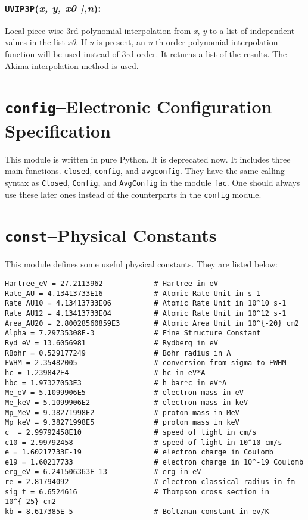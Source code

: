 \documentclass[twoside,letterpaper]{refrep}
\newcommand{\opt}[1]{
  {\textnormal{[}}{#1}\hspace{0.5mm}{\textnormal{]}}}
\newcommand{\var}[1]{\textit{#1}}
\newcommand{\key}[1]{\texttt{#1}}
\newcommand{\mod}[1]{\texttt{#1}}
\newenvironment{fundesc}[2]{
	\begin{center}
	\begin{minipage}{\textwidth}
	\subsubsection*{\key{\textbf{#1}}(\var{#2}):}
	\index{#1}
	\addcontentsline{toc}{subsubsection}{#1}}
	{\end{minipage}\end{center}}
\begin{document}
\begin{fundesc}{UVIP3P}{x, y, x0\opt{,n}}
Local piece-wise 3rd polynomial interpolation from \var{x}, \var{y} to a list
of independent values in the list \var{x0}. If \var{n} is present, an
\var{n}-th order polynomial interpolation function will be used instead of 3rd
order. It returns a list of the results. The Akima interpolation method is
used.
\end{fundesc}

\section{\mod{config}--Electronic Configuration Specification}
\label{sec:config}
This module is written in pure Python. It is deprecated now. It includes three
main functions. \key{closed}, \key{config}, and \key{avgconfig}. They have the
same calling syntax as \key{Closed}, \key{Config}, and
\key{AvgConfig} in the module \mod{fac}. One should always use these later
ones instead of the counterparts in the \mod{config} module.

\section{\mod{const}--Physical Constants}
\label{sec:const}
This module defines some useful physical constants. They are listed below:
\begin{verbatim}
Hartree_eV = 27.2113962            # Hartree in eV   
Rate_AU = 4.13413733E16            # Atomic Rate Unit in s-1
Rate_AU10 = 4.13413733E06          # Atomic Rate Unit in 10^10 s-1
Rate_AU12 = 4.13413733E04          # Atomic Rate Unit in 10^12 s-1
Area_AU20 = 2.80028560859E3        # Atomic Area Unit in 10^{-20} cm2
Alpha = 7.29735308E-3              # Fine Structure Constant
Ryd_eV = 13.6056981                # Rydberg in eV
RBohr = 0.529177249                # Bohr radius in A
FWHM = 2.35482005                  # conversion from sigma to FWHM
hc = 1.239842E4                    # hc in eV*A
hbc = 1.97327053E3                 # h_bar*c in eV*A
Me_eV = 5.1099906E5                # electron mass in eV
Me_keV = 5.1099906E2               # electron mass in keV
Mp_MeV = 9.38271998E2              # proton mass in MeV
Mp_keV = 9.38271998E5              # proton mass in keV
c  = 2.99792458E10                 # speed of light in cm/s
c10 = 2.99792458                   # speed of light in 10^10 cm/s
e = 1.60217733E-19                 # electron charge in Coulomb
e19 = 1.60217733                   # electron charge in 10^-19 Coulomb
erg_eV = 6.241506363E-13           # erg in eV
re = 2.81794092                    # electron classical radius in fm
sig_t = 6.6524616                  # Thompson cross section in 10^{-25} cm2
kb = 8.617385E-5                   # Boltzman constant in ev/K
\end{verbatim}
\end{document}
